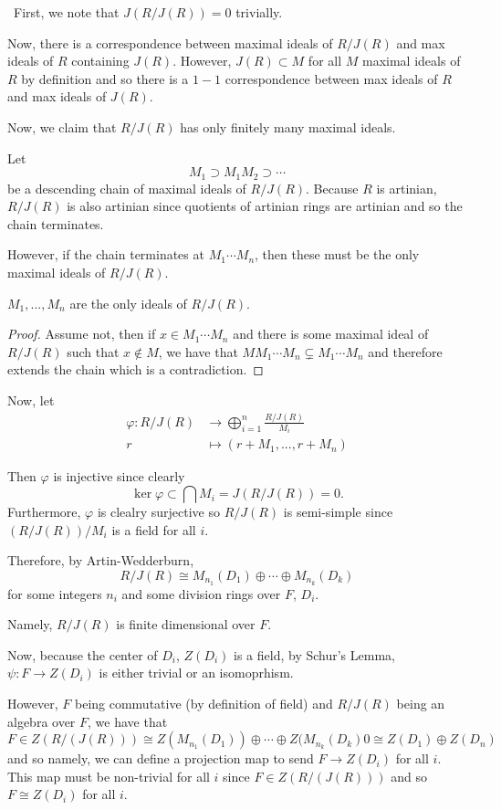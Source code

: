 \documentclass[12pt]{Qual}
\begin{document}
\begin{solution}$\,$
First, we note that $J(R/J(R))=0$ trivially.

Now, there is a correspondence between maximal ideals of $R/J(R)$ and max ideals of $R$ containing $J(R).$ However, $J(R)\subset M$ for all $M$ maximal ideals of $R$ by definition and so there is a $1-1$ correspondence between max ideals of $R$ and max ideals of $J(R).$

Now, we claim that $R/J(R)$ has only finitely many maximal ideals.

Let $$M_1\supset M_1M_2\supset\cdots $$ be a descending chain of maximal ideals of $R/J(R)$. Because $R$ is artinian, $R/J(R)$ is also artinian since quotients of artinian rings are artinian and so the chain terminates.

However, if the chain terminates at $M_1\cdots M_n$, then these must be the only maximal ideals of $R/J(R).$

\begin{claim} $M_1,...,M_n$ are the only ideals of $R/J(R).$
\begin{proof}
Assume not, then if $x\in M_1\cdots M_n$ and there is some maximal ideal of $R/J(R)$ such that $x\notin M$, we have that $MM_1\cdots M_n\subsetneq M_1\cdots M_n$ and therefore extends the chain which is a contradiction.
\end{proof}
\end{claim}

Now, let \begin{align*}
    \varphi: R/J(R)&\to\bigoplus_{i=1}^n\frac{R/J(R)}{M_i}\\
    r&\mapsto(r+M_1,...,r+M_n)
\end{align*}

Then $\varphi$ is injective since clearly $$\ker\varphi\subset \bigcap M_i=J(R/J(R))=0.$$ Furthermore, $\varphi$ is clealry surjective so $R/J(R)$ is semi-simple since $(R/J(R))/M_i$ is a field for all $i.$

Therefore, by Artin-Wedderburn, $$R/J(R)\cong M_{n_1}(D_1)\oplus\cdots\oplus M_{n_k}(D_k)$$ for some integers $n_i$ and some division rings over $F$, $D_i$.

Namely, $R/J(R)$ is finite dimensional over $F$.

Now, because the center of $D_i$, $Z(D_i)$ is a field, by Schur's Lemma, $\psi:F\to Z(D_i)$ is either trivial or an isomoprhism.

However, $F$ being commutative (by definition of field) and $R/J(R)$ being an algebra over $F$, we have that $$F\in Z(R/(J(R)))\cong  Z(M_{n_1}(D_1))\oplus\cdots\oplus Z(M_{n_k}(D_k)0\cong Z(D_1)\oplus Z(D_n)$$ and so namely, we can define a projection map to send $F\to Z(D_i)$ for all $i.$ This map must be non-trivial for all $i$ since $F\in Z(R/(J(R)))$ and so $F\cong Z(D_i)$ for all $i.$


\end{solution}
\end{document}

